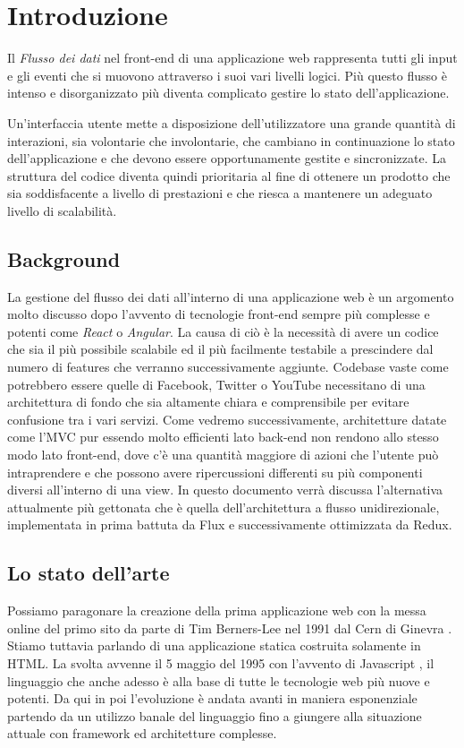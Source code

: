\chapter{Introduzione}
Il \textit{Flusso dei dati} nel front-end di una applicazione web rappresenta tutti gli input e gli eventi che si muovono attraverso i suoi vari livelli logici. Più questo flusso è intenso e disorganizzato più diventa complicato gestire lo stato dell'applicazione.

Un'interfaccia utente mette a disposizione dell'utilizzatore una grande quantità di interazioni, sia volontarie che involontarie, che cambiano in continuazione lo stato dell'applicazione e che devono essere opportunamente gestite e sincronizzate. La struttura del codice diventa quindi prioritaria al fine di ottenere un prodotto che sia soddisfacente a livello di prestazioni e che riesca a mantenere un adeguato livello di scalabilità.

\section{Background}
La gestione del flusso dei dati all'interno di una applicazione web è un argomento molto discusso dopo l'avvento di tecnologie front-end sempre più complesse e potenti come \textit{React} o \textit{Angular}. La causa di ciò è la necessità di avere un codice che sia il più possibile scalabile ed il più facilmente testabile a prescindere dal numero di features che verranno successivamente aggiunte. 
Codebase vaste come potrebbero essere quelle di Facebook, Twitter o YouTube necessitano di una architettura di fondo che sia altamente chiara e comprensibile per evitare confusione tra i vari servizi.
Come vedremo successivamente, architetture datate come l'MVC pur essendo molto efficienti lato back-end non rendono allo stesso modo lato front-end, dove c'è una quantità maggiore di azioni che l'utente può intraprendere e che possono avere ripercussioni differenti su più componenti diversi all'interno di una view.
In questo documento verrà discussa l'alternativa attualmente più gettonata che è quella dell'architettura a flusso unidirezionale, implementata in prima battuta da Flux e successivamente ottimizzata da Redux.

\section{Lo stato dell'arte}
Possiamo paragonare la creazione della prima applicazione web con la messa online del primo sito da parte di Tim Berners-Lee nel 1991 dal Cern di Ginevra \cite{HuffingtonpostFirstWebsite}. Stiamo tuttavia parlando di una applicazione statica costruita solamente in HTML. La svolta avvenne il 5 maggio del 1995 con l'avvento di Javascript \cite{W3cJavascriptHistory}, il linguaggio che anche adesso è alla base di tutte le tecnologie web più nuove e potenti. Da qui in poi l'evoluzione è andata avanti in maniera esponenziale partendo da un utilizzo banale del linguaggio fino a giungere alla situazione attuale con framework ed architetture complesse.

